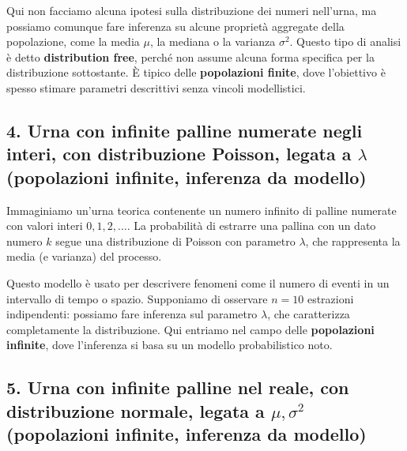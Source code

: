 \documentclass[
  11pt,
]{book}
\theoremstyle{mytheoremstyle}
\theoremstyle{mydefstyle}
\begin{document}
Qui non facciamo alcuna ipotesi sulla distribuzione dei numeri nell'urna, ma possiamo comunque fare inferenza su alcune proprietà aggregate della popolazione, come la media \(\mu\), la mediana o la varianza \(\sigma^2\). Questo tipo di analisi è detto \textbf{distribution free}, perché non assume alcuna forma specifica per la distribuzione sottostante. È tipico delle \textbf{popolazioni finite}, dove l'obiettivo è spesso stimare parametri descrittivi senza vincoli modellistici.

\subsection{\texorpdfstring{4. Urna con infinite palline numerate negli interi, con distribuzione Poisson, legata a \(\lambda\) (popolazioni infinite, inferenza da modello)}{4. Urna con infinite palline numerate negli interi, con distribuzione Poisson, legata a \textbackslash lambda (popolazioni infinite, inferenza da modello)}}\label{urna-con-infinite-palline-numerate-negli-interi-con-distribuzione-poisson-legata-a-lambda-popolazioni-infinite-inferenza-da-modello}

Immaginiamo un'urna teorica contenente un numero infinito di palline numerate con valori interi \(0, 1, 2, \dots\). La probabilità di estrarre una pallina con un dato numero \(k\) segue una distribuzione di Poisson con parametro \(\lambda\), che rappresenta la media (e varianza) del processo.

Questo modello è usato per descrivere fenomeni come il numero di eventi in un intervallo di tempo o spazio. Supponiamo di osservare \(n = 10\) estrazioni indipendenti: possiamo fare inferenza sul parametro \(\lambda\), che caratterizza completamente la distribuzione. Qui entriamo nel campo delle \textbf{popolazioni infinite}, dove l'inferenza si basa su un modello probabilistico noto.

\subsection{\texorpdfstring{5. Urna con infinite palline nel reale, con distribuzione normale, legata a \(\mu, \sigma^2\) (popolazioni infinite, inferenza da modello)}{5. Urna con infinite palline nel reale, con distribuzione normale, legata a \textbackslash mu, \textbackslash sigma\^{}2 (popolazioni infinite, inferenza da modello)}}\label{urna-con-infinite-palline-nel-reale-con-distribuzione-normale-legata-a-mu-sigma2-popolazioni-infinite-inferenza-da-modello}
\end{document}
